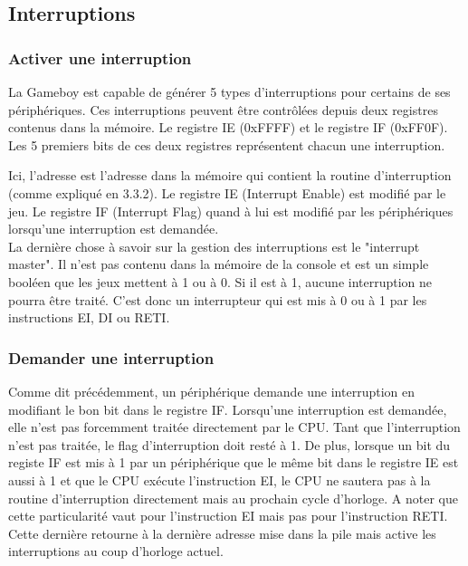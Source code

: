 \documentclass[a4paper]{article}
\begin{document}

\subsection{Interruptions}

\subsubsection{Activer une interruption}
La Gameboy est capable de générer 5 types d'interruptions pour certains de ses
périphériques. Ces interruptions peuvent être contrôlées depuis deux registres
contenus dans la mémoire. Le registre IE (0xFFFF) et le registre IF (0xFF0F).
Les 5 premiers bits de ces deux registres représentent chacun une interruption.
\begin{center}
\end{center}
Ici, l'adresse est l'adresse dans la mémoire qui contient la routine d'interruption
(comme expliqué en 3.3.2). Le registre IE (Interrupt Enable) est modifié par le jeu.
Le registre IF (Interrupt Flag) quand à lui est modifié par les périphériques lorsqu'une 
interruption est demandée. \\

La dernière chose à savoir sur la gestion des interruptions est le "interrupt master".
Il n'est pas contenu dans la mémoire de la console et est un simple booléen que les
jeux mettent à 1 ou à 0. Si il est à 1, aucune interruption ne pourra être traité.
C'est donc un interrupteur qui est mis à 0 ou à 1 par les instructions EI, DI ou RETI.

\subsubsection{Demander une interruption}
Comme dit précédemment, un périphérique demande une interruption en modifiant le
bon bit dans le registre IF. Lorsqu'une interruption est demandée, elle n'est pas
forcemment traitée directement par le CPU. Tant que l'interruption n'est pas traitée,
le flag d'interruption doit resté à 1. De plus, lorsque un bit du registe IF est mis
à 1 par un périphérique que le même bit dans le registre IE est aussi à 1 et que
le CPU exécute l'instruction EI, le CPU ne sautera pas à la routine d'interruption
directement mais au prochain cycle d'horloge. A noter que cette particularité vaut 
pour l'instruction EI mais pas pour l'instruction RETI. Cette dernière retourne à
la dernière adresse mise dans la pile mais active les interruptions au coup d'horloge
actuel. \\
\end{document}
